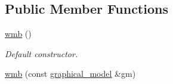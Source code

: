 \subsection*{Public Member Functions}
\begin{DoxyCompactItemize}
\item 
\hyperlink{classmerlin_1_1wmb_ad0c30c53e9d8bbeda74d8d31f62107a9}{wmb} ()\hypertarget{classmerlin_1_1wmb_ad0c30c53e9d8bbeda74d8d31f62107a9}{}\label{classmerlin_1_1wmb_ad0c30c53e9d8bbeda74d8d31f62107a9}

\begin{DoxyCompactList}\small\item\em Default constructor. \end{DoxyCompactList}\item 
\hyperlink{classmerlin_1_1wmb_abef767965df7df0ac02ec38ca531dccd}{wmb} (const \hyperlink{classmerlin_1_1graphical__model}{graphical\+\_\+model} \&gm)\hypertarget{classmerlin_1_1wmb_abef767965df7df0ac02ec38ca531dccd}{}\label{classmerlin_1_1wmb_abef767965df7df0ac02ec38ca531dccd}


\end{DoxyCompactItemize}

